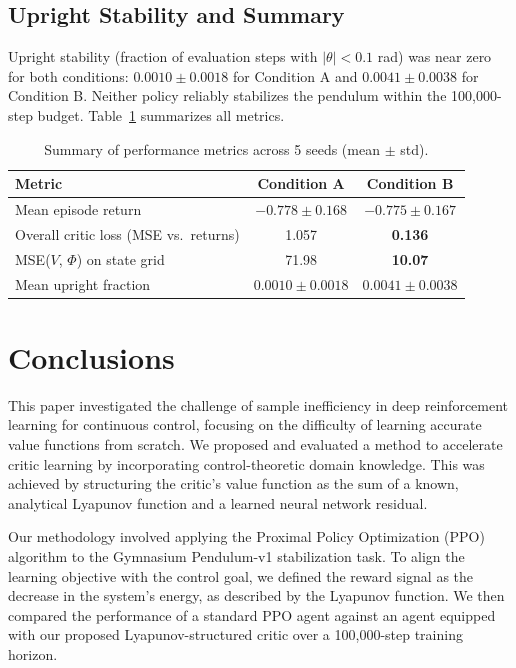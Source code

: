 \documentclass[]{article}
\begin{document}
\subsection{Upright Stability and Summary}
Upright stability (fraction of evaluation steps with $|\theta| < 0.1$ rad) was near zero for both conditions: $0.0010 \pm 0.0018$ for Condition A and $0.0041 \pm 0.0038$ for Condition B. Neither policy reliably stabilizes the pendulum within the 100,000-step budget. Table~\ref{tab:summary} summarizes all metrics.

\begin{table}[h]
  \centering
  \caption{Summary of performance metrics across 5 seeds (mean $\pm$ std).}
  \label{tab:summary}
  \begin{tabular}{lcc}
    \toprule
    Metric & Condition A & Condition B \\
    \midrule
    Mean episode return      & $-0.778 \pm 0.168$ & $-0.775 \pm 0.167$ \\
    Overall critic loss (MSE vs.~returns) & 1.057 & \textbf{0.136} \\
    MSE($V$, $\Phi$) on state grid & 71.98 & \textbf{10.07} \\
    Mean upright fraction    & $0.0010 \pm 0.0018$ & $0.0041 \pm 0.0038$ \\
    \bottomrule
  \end{tabular}
\end{table}

\section{Conclusions}
\label{sec:conclusions}
This paper investigated the challenge of sample inefficiency in deep reinforcement learning for continuous control, focusing on the difficulty of learning accurate value functions from scratch. We proposed and evaluated a method to accelerate critic learning by incorporating control-theoretic domain knowledge. This was achieved by structuring the critic's value function as the sum of a known, analytical Lyapunov function and a learned neural network residual.

Our methodology involved applying the Proximal Policy Optimization (PPO) algorithm to the Gymnasium Pendulum-v1 stabilization task. To align the learning objective with the control goal, we defined the reward signal as the decrease in the system's energy, as described by the Lyapunov function. We then compared the performance of a standard PPO agent against an agent equipped with our proposed Lyapunov-structured critic over a 100,000-step training horizon.
\end{document}
